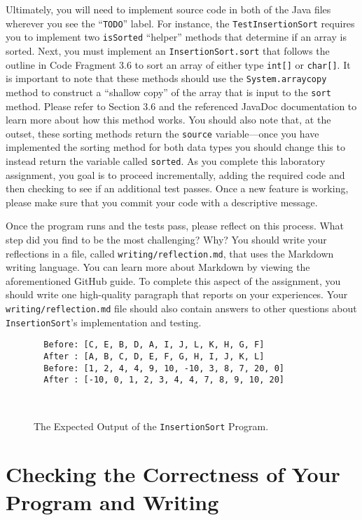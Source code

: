 \documentclass[11pt]{article}
\newcommand{\mainprogram}{\lstinline{InsertionSort}}
\newcommand{\testprogram}{\lstinline{TestInsertionSort}}
\newcommand{\reflection}{\lstinline{writing/reflection.md}}
\newcommand{\command}[1]{``\lstinline{#1}''}
\newcommand{\program}[1]{\lstinline{#1}}
\begin{document}
Ultimately, you will need to implement source code in both of the Java files
wherever you see the \command{TODO} label. For instance, the \testprogram{}
requires you to implement two \program{isSorted} ``helper'' methods that
determine if an array is sorted. Next, you must implement an
\program{InsertionSort.sort} that follows the outline in Code Fragment 3.6 to
sort an array of either type \program{int[]} or \program{char[]}. It is
important to note that these methods should use the \program{System.arraycopy}
method to construct a ``shallow copy'' of the array that is input to the
\program{sort} method. Please refer to Section 3.6 and the referenced JavaDoc
documentation to learn more about how this method works. You should also note
that, at the outset, these sorting methods return the \program{source}
variable---once you have implemented the sorting method for both data types you
should change this to instead return the variable called \program{sorted}. As
you complete this laboratory assignment, you goal is to proceed incrementally,
adding the required code and then checking to see if an additional test passes.
Once a new feature is working, please make sure that you commit your code with a
descriptive message.

Once the program runs and the tests pass, please reflect on this process. What
step did you find to be the most challenging? Why? You should write your
reflections in a file, called \reflection{}, that uses the Markdown writing
language. You can learn more about Markdown by viewing the aforementioned GitHub
guide. To complete this aspect of the assignment, you should write one
high-quality paragraph that reports on your experiences. Your \reflection{} file
should also contain answers to other questions about \mainprogram{}'s
implementation and testing.

\begin{figure}[t]
  \centering
  \begin{verbatim}
  Before: [C, E, B, D, A, I, J, L, K, H, G, F]
  After : [A, B, C, D, E, F, G, H, I, J, K, L]
  Before: [1, 2, 4, 4, 9, 10, -10, 3, 8, 7, 20, 0]
  After : [-10, 0, 1, 2, 3, 4, 4, 7, 8, 9, 10, 20]
  \end{verbatim}
  \vspace*{-.35in}
  \caption{The Expected Output of the \mainprogram{} Program.}~\label{fig:output}
  \vspace*{-.25in}
\end{figure}

\section*{Checking the Correctness of Your Program and Writing}
\end{document}
